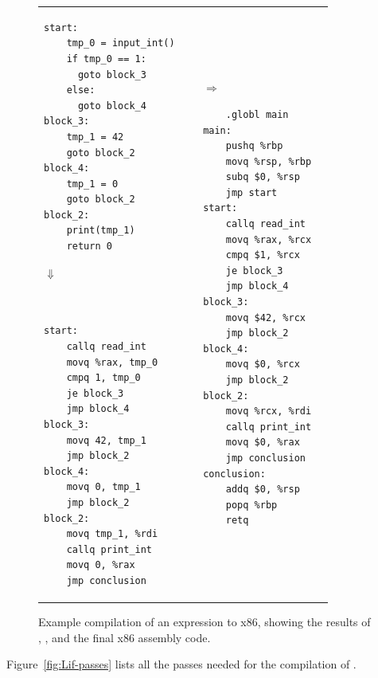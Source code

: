 \documentclass[7x10]{TimesAPriori_MIT}%
\numberwithin{theorem}{chapter}
\numberwithin{definition}{chapter}
\numberwithin{equation}{chapter}
\begin{document}
\begin{figure}[tbp]
\begin{tcolorbox}[colback=white]
{\begin{tabular}{lll}
\begin{minipage}{0.4\textwidth}
\begin{lstlisting}
start:
	tmp_0 = input_int()
	if tmp_0 == 1:
	  goto block_3
	else:
	  goto block_4
block_3:
	tmp_1 = 42
	goto block_2
block_4:
	tmp_1 = 0
	goto block_2
block_2:
	print(tmp_1)
	return 0

\end{lstlisting}
$\Downarrow$
\begin{lstlisting}


start:
	callq read_int
	movq %rax, tmp_0
	cmpq 1, tmp_0
	je block_3
	jmp block_4
block_3:
	movq 42, tmp_1
	jmp block_2
block_4:
	movq 0, tmp_1
	jmp block_2
block_2:
	movq tmp_1, %rdi
	callq print_int
	movq 0, %rax
	jmp conclusion        
\end{lstlisting}
\end{minipage}
&
$\Rightarrow\qquad$
\begin{minipage}{0.4\textwidth}
\begin{lstlisting}
	.globl main
main:
	pushq %rbp
	movq %rsp, %rbp
	subq $0, %rsp
	jmp start
start:
	callq read_int
	movq %rax, %rcx
	cmpq $1, %rcx
	je block_3
	jmp block_4
block_3:
	movq $42, %rcx
	jmp block_2
block_4:
	movq $0, %rcx
	jmp block_2
block_2:
	movq %rcx, %rdi
	callq print_int
	movq $0, %rax
	jmp conclusion
conclusion:
	addq $0, %rsp
	popq %rbp
	retq
\end{lstlisting}
\end{minipage}
\end{tabular}
\fi}
\end{tcolorbox}

  \caption{Example compilation of an  expression to x86, showing
  the results of ,
  , and the final x86 assembly code.  }
\label{fig:if-example-x86}
\end{figure}

Figure~\ref{fig:Lif-passes} lists all the passes needed for the
compilation of \LangIf{}.
\end{document}
